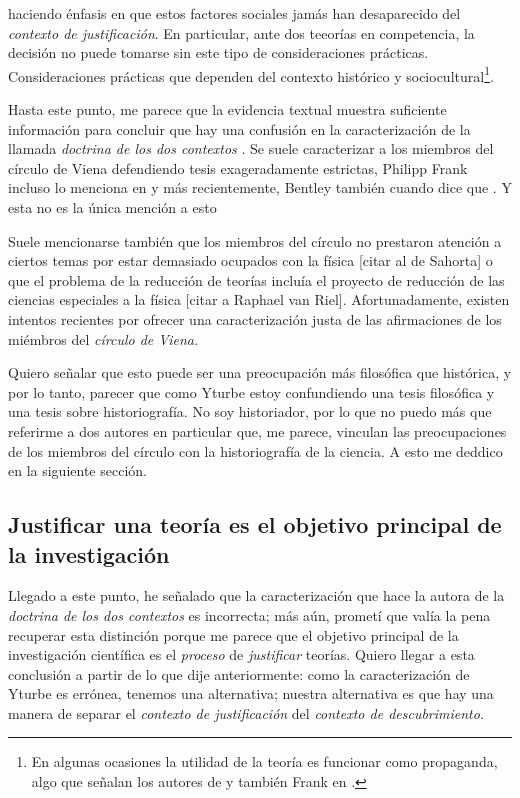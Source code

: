 haciendo énfasis en que estos factores sociales jamás han desaparecido del \emph{contexto de justificación}.
En particular, ante dos teeorías en competencia, la decisión no puede tomarse sin este tipo de consideraciones prácticas.
Consideraciones prácticas que dependen del contexto histórico y sociocultural\footnote{En algunas ocasiones la utilidad de la teoría es funcionar como propaganda, algo que señalan los autores de \parencite{Lewontin2017}  y también Frank en \parencite{}.}.

Hasta este punto, me parece que la evidencia textual muestra suficiente información para concluir que hay una confusión en la caracterización de la llamada \emph{doctrina de los dos contextos} \parencite{Yturbe1995}.
Se suele caracterizar a los miembros del círculo de Viena defendiendo tesis exageradamente estrictas, Philipp Frank incluso lo menciona en  y más recientemente, Bentley también cuando dice que .
Y esta no es la única mención a esto 

Suele mencionarse también que los miembros del círculo no prestaron atención a ciertos temas por estar demasiado ocupados con la física [citar al de Sahorta] o que el problema de la reducción de teorías incluía el proyecto de reducción de las ciencias especiales a la física [citar a Raphael van Riel].
Afortunadamente, existen intentos recientes por ofrecer una caracterización justa de las afirmaciones de los miémbros del \emph{círculo de Viena.}

Quiero señalar que esto puede ser una preocupación más filosófica que histórica, y por lo tanto, parecer que como Yturbe \cite{Yturbe1995} estoy confundiendo una tesis filosófica y una tesis sobre historiografía.
No soy historiador, por lo que no puedo más que referirme a dos autores en particular que, me parece, vinculan las preocupaciones de los miembros del círculo con la historiografía de la ciencia.
A esto me deddico en la siguiente sección.


\subsection{Justificar una teoría es el objetivo principal de la investigación}

Llegado a este punto, he señalado que la caracterización que hace la autora de la \emph{doctrina de los dos contextos} es incorrecta; 
más aún, prometí que valía la pena recuperar esta distinción porque me parece que el objetivo principal de la investigación 
científica es el \emph{proceso} de \emph{justificar} teorías.
Quiero llegar a esta conclusión a partir de lo que dije anteriormente: como la caracterización de Yturbe es errónea, tenemos una alternativa; 
nuestra alternativa es que hay una manera de separar el \emph{contexto de justificación} del \emph{contexto de descubrimiento}.





